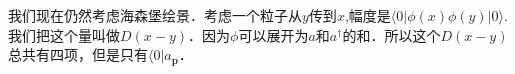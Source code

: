 
我们现在仍然考虑海森堡绘景．考虑一个粒子从$y$传到$x$,幅度是$\langle 0 |\phi(x)\phi(y)| 0 \rangle$.我们把这个量叫做$D(x-y)$．因为$\phi$可以展开为$a$和$a^\dagger$的和．所以这个$D(x-y)$总共有四项，但是只有$\langle 0 | a_{\mathbf p} $．